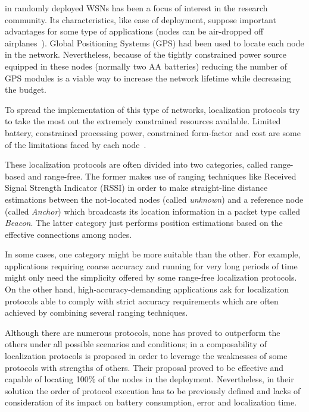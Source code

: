  in randomly deployed WSNs has been a focus of interest in the research community. Its characteristics, like ease of deployment, suppose important advantages for some type of applications (nodes can be air-dropped off airplanes~\cite{airDroppedVolvano}). Global Positioning Systems (GPS) had been used to locate each node in the network. Nevertheless, because of the tightly constrained power source equipped in these nodes (normally two AA batteries) reducing the number of GPS modules is a viable way to increase the network lifetime while decreasing the budget.

To spread the implementation of this type of networks, localization protocols try to take the most out the extremely constrained resources available. Limited battery, constrained processing power, constrained form-factor and cost are some of the limitations faced by each node~\cite{AkyildizWSNs}.

These localization protocols are often divided into two categories, called range-based and range-free. The former makes use of ranging techniques like Received Signal Strength Indicator (RSSI) in order to make straight-line distance estimations between the not-located nodes (called \emph{unknown}) and a reference node (called \emph{Anchor}) which broadcasts its location information in a packet type called \emph{Beacon}. The latter category just performs position estimations based on the effective connections among nodes. 

In some cases, one category might be more suitable than the other. For example, applications requiring coarse accuracy and running for very long periods of time might only need the simplicity offered by some range-free localization protocols. On the other hand, high-accuracy-demanding applications ask for localization protocols able to comply with strict accuracy requirements which are often achieved by combining several ranging techniques.

Although there are numerous protocols, none has proved to outperform the others under all possible scenarios and conditions; in \cite{composability} a composability of localization protocols is proposed in order to leverage the weaknesses of some protocols with strengths of others. Their proposal proved to be effective and capable of locating 100\% of the nodes in the deployment. Nevertheless, in their solution the order of protocol execution has to be previously defined and lacks of consideration of its impact on battery consumption, error and localization time.

